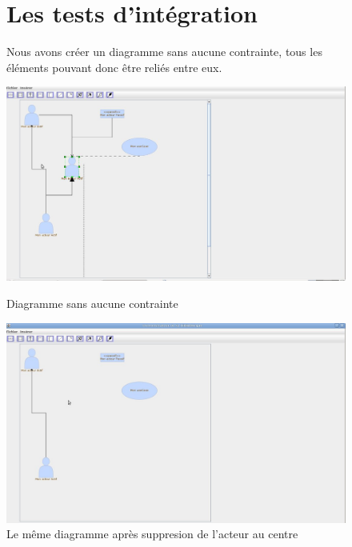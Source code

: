 \documentclass[12pt,a4paper,openany]{report}
\begin{document}
			\begin{figure}[H]
				\section{Les tests d'intégration}
					\begin{flushleft}	Nous avons créer un diagramme sans aucune contrainte, tous les éléments pouvant donc être reliés entre eux. \end{flushleft}
							\centering
					\includegraphics[width=18cm]{integration1.jpg}
					\caption{Diagramme sans aucune contrainte}
				\includegraphics[width=18cm]{integration2.jpg}
				\caption{Le même diagramme après suppresion de l'acteur au centre}
			\end{figure}
\end{document}
